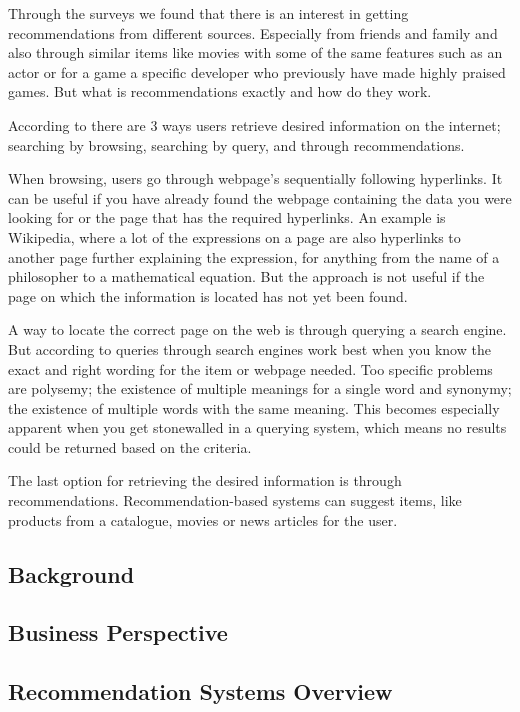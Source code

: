Through the surveys we found that there is an interest in getting recommendations from different sources. Especially from friends and family and also through similar items like movies with some of the same features such as an actor or for a game a specific developer who previously have made highly praised games. But what is recommendations exactly and how do they work.

According to \cite{TheAdaptiveWeb} there are 3 ways users retrieve desired information on the internet; searching by browsing, searching by query, and through recommendations.

When browsing, users go through webpage's sequentially following hyperlinks. It can be useful if you have already found the webpage containing the data you were looking for or the page that has the required hyperlinks. An example is Wikipedia, where a lot of the expressions on a page are also hyperlinks to another page further explaining the expression, for anything from the name of a philosopher to a mathematical equation. But the approach is not useful if the page on which the information is located has not yet been found.


A way to locate the correct page on the web is through querying a search engine. But according to \cite{TheAdaptiveWeb} queries through search engines work best when you know the exact and right wording for the item or webpage needed. Too specific problems are polysemy; the existence of multiple meanings for a single word and synonymy; the existence of multiple words with the same meaning. This becomes especially apparent when you get stonewalled in a querying system, which means no results could be returned based on the criteria.


The last option for retrieving the desired information is through recommendations. Recommendation-based systems can suggest items, like products from a catalogue, movies or news articles for the user.


\subsection{Background}
\label{Background}

\subsection{Business Perspective}
\label{BusiPers}

\subsection{Recommendation Systems Overview}
\label{Overview}
